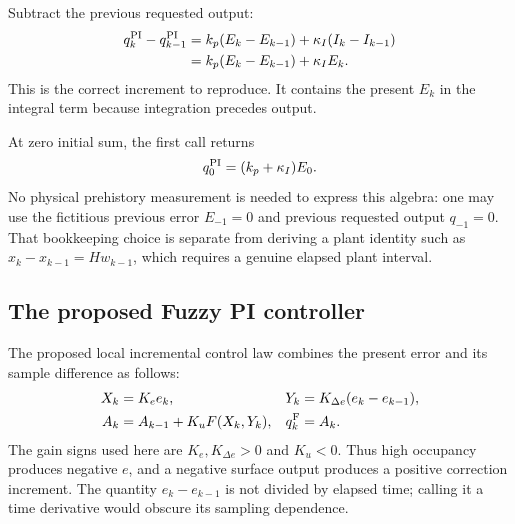 Subtract the previous requested output:
\begin{align}
 q_k^{\rm PI}-q_{k-1}^{\rm PI}
 &=k_p(E_k-E_{k-1})+\kappa_I(I_k-I_{k-1})\\
 &=k_p(E_k-E_{k-1})+\kappa_I E_k.
 \label{eq:fpi_pi_increment}
\end{align}
This is the correct increment to reproduce. It contains the present
$E_k$ in the integral term because integration precedes output.

At zero initial sum, the first call returns
\begin{equation}
 q_0^{\rm PI}=(k_p+\kappa_I)E_0.
 \label{eq:fpd_first}
\end{equation}
No physical prehistory measurement is needed to express this algebra:
one may use the fictitious previous error $E_{-1}=0$ and previous requested
output $q_{-1}=0$. That bookkeeping choice is separate from deriving a
plant identity such as $x_k-x_{k-1}=H w_{k-1}$, which requires a genuine
elapsed plant interval.

\subsection{The proposed Fuzzy PI controller}

The proposed local incremental control law combines the present error
and its sample difference as follows:
\begin{align}
 X_k&=K_e e_k,&Y_k&=K_{\Delta e}(e_k-e_{k-1}),\\
 A_k&=A_{k-1}+K_uF(X_k,Y_k),&q_k^{\rm F}&=A_k.
 \label{eq:fpi_fuzzy_law}
\end{align}
The gain signs used here are $K_e,K_{\Delta e}>0$ and $K_u<0$. Thus high occupancy
produces negative $e$, and a negative surface output produces a positive
correction increment. The quantity $e_k-e_{k-1}$ is not divided by elapsed
time; calling it a time derivative would obscure its sampling dependence.


